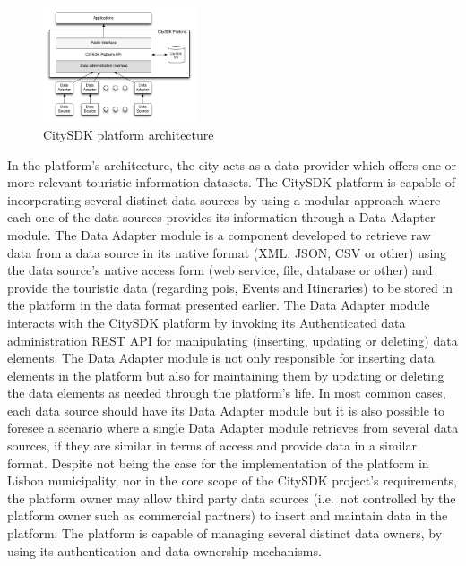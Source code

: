 \documentclass[times,doublespace]{ettauth}%
\begin{document}
\begin{figure}[!ht]
\centering
\includegraphics[width=0.4\textwidth]{images/architecture}
\caption{CitySDK platform architecture}
\label{fig:architecture}
\end{figure}

In the platform's architecture, the city acts as a data provider which offers one or more relevant touristic information datasets. 
The CitySDK platform is capable of incorporating several distinct data sources by using a modular approach where each one of the data sources provides its information through a Data Adapter module. 
The Data Adapter module is a component developed to retrieve raw data from a data source in its native format (XML, JSON, CSV or other) using the data source's native access form (web service, file, database or other) and provide the touristic data (regarding \acp{poi}, Events and Itineraries) to be stored in the platform in the data format presented earlier. 
The Data Adapter module interacts with the CitySDK platform by invoking its Authenticated data administration REST API for manipulating (inserting, updating or deleting) data elements. 
The Data Adapter module is not only responsible for inserting data elements in the platform but also for maintaining them by updating or deleting the data elements as needed through the platform's life. 
In most common cases, each data source should have its Data Adapter module but it is also possible to foresee a scenario where a single Data Adapter module retrieves from several data sources, if they are similar in terms of access and provide data in a similar format. 
Despite not being the case for the implementation of the platform in Lisbon municipality, nor in the core scope of the CitySDK project's requirements, the platform owner may allow third party data sources (i.e.\  not controlled by the platform owner such as commercial partners) to insert and maintain data in the platform. 
The platform is capable of managing several distinct data owners, by using its authentication and data ownership mechanisms.
\end{document}
